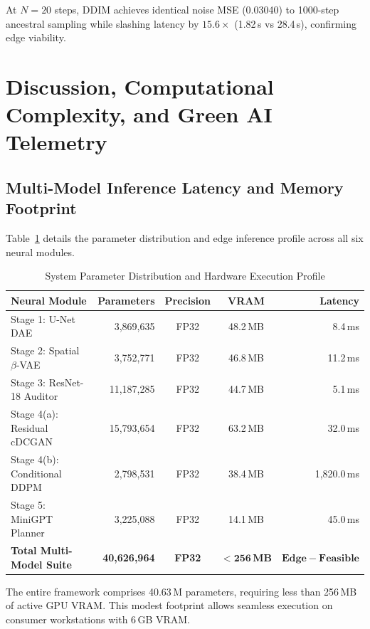\documentclass[journal]{IEEEtran}
\begin{document}
At $N=20$ steps, DDIM achieves identical noise MSE (0.03040) to 1000-step ancestral sampling while slashing latency by $15.6\times$ (1.82\,s vs 28.4\,s), confirming edge viability.

\section{Discussion, Computational Complexity, and Green AI Telemetry}

\subsection{Multi-Model Inference Latency and Memory Footprint}
Table~\ref{tab:hardware_audit} details the parameter distribution and edge inference profile across all six neural modules.

\begin{table}[htbp]
\caption{System Parameter Distribution and Hardware Execution Profile}
\label{tab:hardware_audit}
\centering
\scriptsize
\renewcommand{\arraystretch}{1.12}
\setlength{\tabcolsep}{4pt}
\begin{tabularx}{\columnwidth}{@{}X r c c r@{}}
\toprule
\textbf{Neural Module} & \textbf{Parameters} & \textbf{Precision} & \textbf{VRAM} & \textbf{Latency} \\
\midrule
Stage 1: U-Net DAE & 3,869,635 & FP32 & 48.2\,MB & 8.4\,ms \\
Stage 2: Spatial $\beta$-VAE & 3,752,771 & FP32 & 46.8\,MB & 11.2\,ms \\
Stage 3: ResNet-18 Auditor & 11,187,285 & FP32 & 44.7\,MB & 5.1\,ms \\
Stage 4(a): Residual cDCGAN & 15,793,654 & FP32 & 63.2\,MB & 32.0\,ms \\
Stage 4(b): Conditional DDPM & 2,798,531 & FP32 & 38.4\,MB & 1,820.0\,ms \\
Stage 5: MiniGPT Planner & 3,225,088 & FP32 & 14.1\,MB & 45.0\,ms \\
\midrule
\textbf{Total Multi-Model Suite} & \textbf{40,626,964} & \textbf{FP32} & $\mathbf{<256\,MB}$ & $\mathbf{Edge-Feasible}$ \\
\bottomrule
\end{tabularx}
\end{table}

The entire framework comprises 40.63\,M parameters, requiring less than 256\,MB of active GPU VRAM. This modest footprint allows seamless execution on consumer workstations with 6\,GB VRAM.
\end{document}
